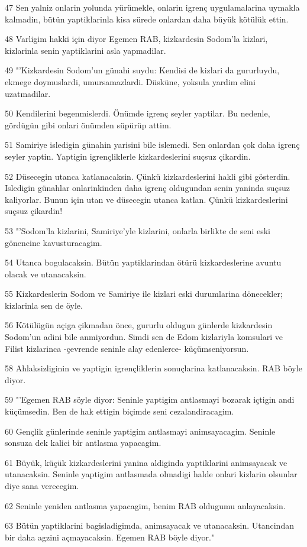 \par 47 Sen yalniz onlarin yolunda yürümekle, onlarin igrenç uygulamalarina uymakla kalmadin, bütün yaptiklarinla kisa sürede onlardan daha büyük kötülük ettin.
\par 48 Varligim hakki için diyor Egemen RAB, kizkardesin Sodom'la kizlari, kizlarinla senin yaptiklarini asla yapmadilar.
\par 49 "'Kizkardesin Sodom'un günahi suydu: Kendisi de kizlari da gururluydu, ekmege doymuslardi, umursamazlardi. Düsküne, yoksula yardim elini uzatmadilar.
\par 50 Kendilerini begenmislerdi. Önümde igrenç seyler yaptilar. Bu nedenle, gördügün gibi onlari önümden süpürüp attim.
\par 51 Samiriye isledigin günahin yarisini bile islemedi. Sen onlardan çok daha igrenç seyler yaptin. Yaptigin igrençliklerle kizkardeslerini suçsuz çikardin.
\par 52 Düsecegin utanca katlanacaksin. Çünkü kizkardeslerini hakli gibi gösterdin. Isledigin günahlar onlarinkinden daha igrenç oldugundan senin yaninda suçsuz kaliyorlar. Bunun için utan ve düsecegin utanca katlan. Çünkü kizkardeslerini suçsuz çikardin!
\par 53 "'Sodom'la kizlarini, Samiriye'yle kizlarini, onlarla birlikte de seni eski gönencine kavusturacagim.
\par 54 Utanca bogulacaksin. Bütün yaptiklarindan ötürü kizkardeslerine avuntu olacak ve utanacaksin.
\par 55 Kizkardeslerin Sodom ve Samiriye ile kizlari eski durumlarina dönecekler; kizlarinla sen de öyle.
\par 56 Kötülügün açiga çikmadan önce, gururlu oldugun günlerde kizkardesin Sodom'un adini bile anmiyordun. Simdi sen de Edom kizlariyla komsulari ve Filist kizlarinca -çevrende seninle alay edenlerce- küçümseniyorsun.
\par 58 Ahlaksizliginin ve yaptigin igrençliklerin sonuçlarina katlanacaksin. RAB böyle diyor.
\par 59 "'Egemen RAB söyle diyor: Seninle yaptigim antlasmayi bozarak içtigin andi küçümsedin. Ben de hak ettigin biçimde seni cezalandiracagim.
\par 60 Gençlik günlerinde seninle yaptigim antlasmayi animsayacagim. Seninle sonsuza dek kalici bir antlasma yapacagim.
\par 61 Büyük, küçük kizkardeslerini yanina aldiginda yaptiklarini animsayacak ve utanacaksin. Seninle yaptigim antlasmada olmadigi halde onlari kizlarin olsunlar diye sana verecegim.
\par 62 Seninle yeniden antlasma yapacagim, benim RAB oldugumu anlayacaksin.
\par 63 Bütün yaptiklarini bagisladigimda, animsayacak ve utanacaksin. Utancindan bir daha agzini açmayacaksin. Egemen RAB böyle diyor."

